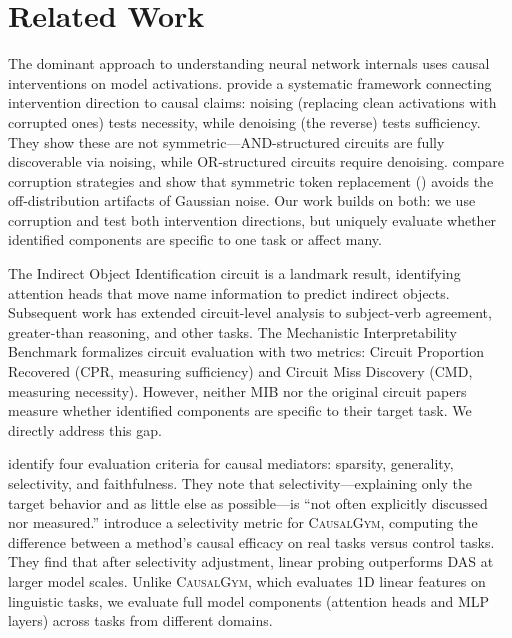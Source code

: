\section{Related Work}
\label{sec:related}

The dominant approach to understanding neural network internals uses causal interventions on model activations. \citet{heimersheim2024interpret} provide a systematic framework connecting intervention direction to causal claims: noising (replacing clean activations with corrupted ones) tests necessity, while denoising (the reverse) tests sufficiency. They show these are not symmetric---AND-structured circuits are fully discoverable via noising, while OR-structured circuits require denoising. \citet{zhang2023best} compare corruption strategies and show that symmetric token replacement (\str) avoids the off-distribution artifacts of Gaussian noise. Our work builds on both: we use \str corruption and test both intervention directions, but uniquely evaluate whether identified components are specific to one task or affect many.

The Indirect Object Identification circuit \citep{wang2022interpretability} is a landmark result, identifying attention heads that move name information to predict indirect objects. Subsequent work has extended circuit-level analysis to subject-verb agreement, greater-than reasoning, and other tasks. The Mechanistic Interpretability Benchmark \citep[\textsc{MIB};][]{mueller2025mib} formalizes circuit evaluation with two metrics: Circuit Proportion Recovered (\textsc{CPR}, measuring sufficiency) and Circuit Miss Discovery (\textsc{CMD}, measuring necessity). However, neither \textsc{MIB} nor the original circuit papers measure whether identified components are specific to their target task. We directly address this gap.

\citet{mueller2024quest} identify four evaluation criteria for causal mediators: sparsity, generality, selectivity, and faithfulness. They note that selectivity---explaining only the target behavior and as little else as possible---is ``not often explicitly discussed nor measured.'' \citet{arora2024causalgym} introduce a selectivity metric for \textsc{CausalGym}, computing the difference between a method's causal efficacy on real tasks versus control tasks. They find that after selectivity adjustment, linear probing outperforms DAS at larger model scales. Unlike \textsc{CausalGym}, which evaluates 1D linear features on linguistic tasks, we evaluate full model components (attention heads and MLP layers) across tasks from different domains.

